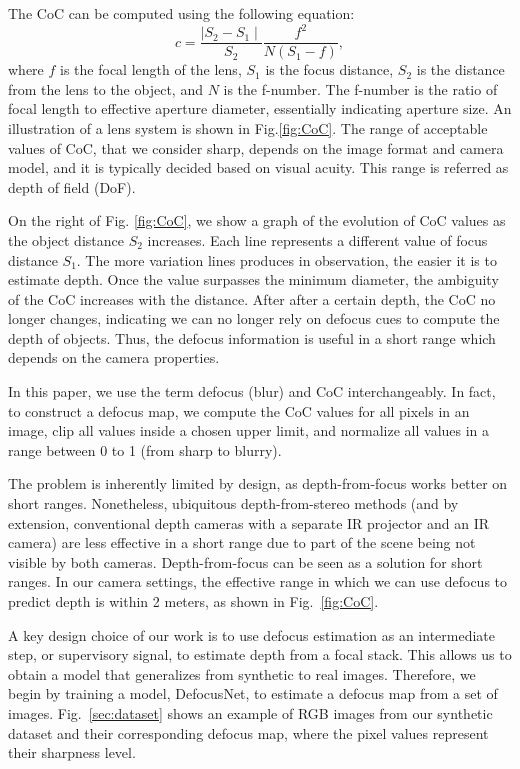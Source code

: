 \documentclass[10pt,twocolumn,letterpaper]{article}
\begin{document}
The CoC can be computed using the following equation:
\begin{equation} \label{eq:coc}
c = \frac{\mid S_2-S_1 \mid}{S_2} \frac{f^2}{N(S_1-f)},
\end{equation}
where $f$ is the focal length of the lens, 
$S_1$ is the focus distance, $S_2$ is the distance from the lens to the object, and $N$ is the f-number. 
The f-number is the ratio of focal length to effective aperture diameter, essentially indicating aperture size. An illustration of a lens system is shown in Fig.\ref{fig:CoC}.  
The range of acceptable values of CoC, that we consider sharp, depends on the image format and camera model, and it is typically decided based on visual acuity. This range is referred as depth of field (DoF). 

On the right of Fig. \ref{fig:CoC}, we show a graph of the evolution of CoC values as the object distance $S_2$ increases. Each line represents a different value of focus distance $S_1$. 
The more variation lines produces in observation, the easier it is to estimate depth. 
Once the value surpasses the minimum diameter, the ambiguity of the CoC increases with the distance. 
After after a certain depth, the CoC no longer changes, indicating we can no longer rely on defocus cues to compute the depth of objects.
Thus, the defocus information is useful in a short range which depends on the camera properties. 

In this paper, we use the term defocus (blur) and CoC interchangeably. 
In fact, to construct a defocus map, we compute the CoC values for all pixels in an image, clip all values inside a chosen upper limit, and normalize all values in a range between 0 to 1 (from sharp to blurry). 

The problem is inherently limited by design, as depth-from-focus works better on short ranges.
Nonetheless, ubiquitous depth-from-stereo methods (and by extension, conventional depth cameras with a separate IR projector and an IR camera) are less effective in a short range due to part of the scene being not visible by both cameras. 
Depth-from-focus can be seen as a solution for short ranges. 
In our camera settings, the effective range in which we can use defocus to predict depth is within 2 meters, as shown in Fig.~\ref{fig:CoC}.

A key design choice of our work is to use defocus estimation as an intermediate step, or supervisory signal, to estimate depth from a focal stack. This allows us to obtain a model that generalizes from synthetic to real images.  
Therefore, we begin by training a model, DefocusNet, to estimate a defocus map from a set of images.
Fig.~\ref{sec:dataset} shows an example of RGB images from our synthetic dataset and their corresponding defocus map, where the pixel values represent their sharpness level.
\end{document}
